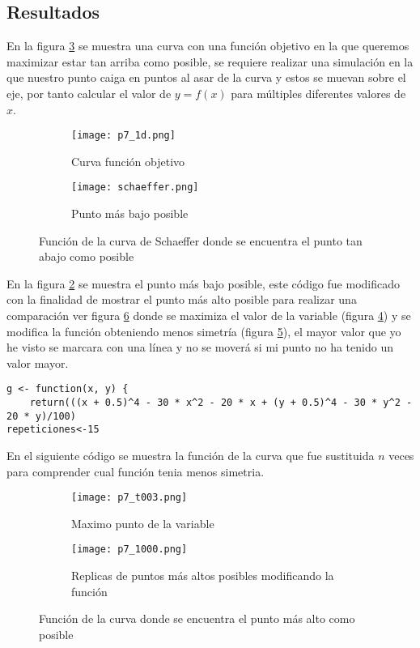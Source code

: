 \documentclass[a4paper]{article}
\begin{document}
\begin{justify}
\section{Resultados}
En la figura \ref{Fig.1} se muestra una curva con una función objetivo en la que queremos maximizar estar tan arriba como posible, se requiere realizar una simulación en la que nuestro punto caiga en puntos al asar de la curva y estos se muevan sobre el eje, por tanto calcular el valor de $y=f(x)$ para múltiples diferentes valores de $x$.
\begin{figure}[h!]
    \centering
\begin{subfigure}[b]{0.45\linewidth}
\texttt{[image: p7\_1d.png]}
\caption{Curva función objetivo}
\label{c4}
\end{subfigure}
\begin{subfigure}[b]{0.45\linewidth}
\texttt{[image: schaeffer.png]}
\caption{Punto más bajo posible}
\label{c5}
\end{subfigure}
\caption{Función de la curva de Schaeffer donde se encuentra el punto tan abajo como posible}
    \label{Fig.1}
\end{figure}
En la figura \ref{c5} se muestra el punto más bajo posible, este código fue modificado con la finalidad de mostrar el punto más alto posible para realizar una comparación ver figura \ref{Fig.2} donde se maximiza el valor de la variable (figura \ref{2a}) y se modifica la función obteniendo menos simetría (figura \ref{2b}), el mayor valor que yo he visto se marcara con una línea y no se moverá si mi punto no ha tenido un valor mayor.
\begin{lstlisting}
g <- function(x, y) {
    return(((x + 0.5)^4 - 30 * x^2 - 20 * x + (y + 0.5)^4 - 30 * y^2 - 20 * y)/100)
repeticiones<-15
\end{lstlisting}
En el siguiente código se muestra la función de la curva que fue sustituida $n$ veces para comprender cual función tenia menos simetria.
\begin{figure}[h!]
    \centering
\begin{subfigure}[b]{0.45\linewidth}
\texttt{[image: p7\_t003.png]}
\caption{Maximo punto de la variable}
\label{2a}
\end{subfigure}
\begin{subfigure}[b]{0.45\linewidth}
\texttt{[image: p7\_1000.png]}
\caption{Replicas de puntos más altos posibles modificando la función}
\label{2b}
\end{subfigure}
\caption{Función de la curva donde se encuentra el punto más alto como posible}
    \label{Fig.2}
\end{figure}


\end{justify}
\end{document}
